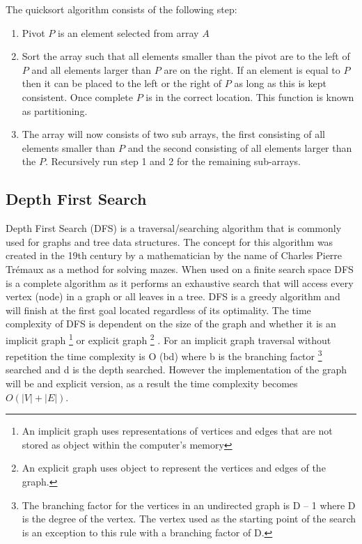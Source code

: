 \documentclass{AISB2008}
\begin{document}
The quicksort algorithm consists of the following step:

\begin{enumerate}
\item Pivot {$P$} is an element selected from array {$A$}
\item Sort the array such that all elements smaller than the pivot are to the left of {$P$} and all elements larger than {$P$} are on the right. If an element is equal to {$P$} then it can be placed to the left or the right of {$P$} as long as this is kept consistent. Once complete {$P$} is in the correct location. This function is known as partitioning.
\item The array will now consists of two sub arrays, the first consisting of all elements smaller than {$P$} and the second consisting of all elements larger than the {$P$}. Recursively run step 1 and 2 for the remaining sub-arrays.
\end{enumerate}

\subsection{Depth First Search}
Depth First Search (DFS) is a traversal/searching algorithm that is commonly used for graphs and tree data structures. The concept for this algorithm was created in the 19th century by a mathematician by the name of Charles Pierre Trémaux as a method for solving mazes. When used on a finite search space DFS is a complete algorithm as it performs an exhaustive search that will access every vertex (node) in a graph or all leaves in a tree. DFS is a greedy algorithm and will finish at the first goal located regardless of its optimality. The time complexity of DFS is dependent on the size of the graph and whether it is an implicit graph \footnote{An implicit graph uses representations of vertices and edges that are not stored as object within the computer’s memory}  or explicit graph \footnote{An explicit graph uses object to represent the vertices and edges of the graph.} . For an implicit graph traversal without repetition the time complexity is O (bd) where b is the branching factor \footnote{The branching factor for the vertices in an undirected graph is D – 1 where D is the degree of the vertex. The vertex used as the starting point of the search is an exception to this rule with a branching factor of D.} searched and d is the depth searched. However the implementation of the graph will be and explicit version, as a result the time complexity becomes {$O (|V| + |E|)$}.
\end{document}
